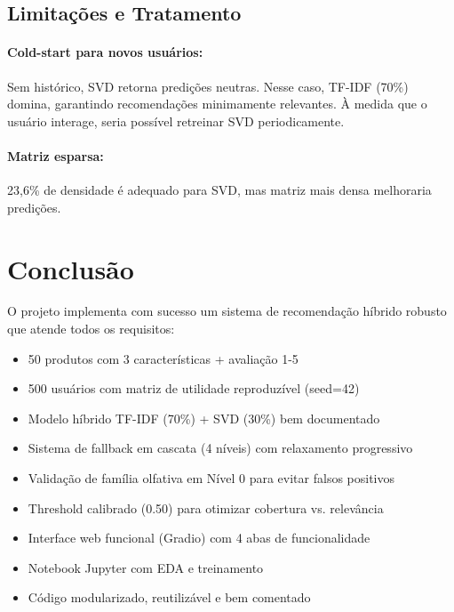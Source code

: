 \documentclass[12pt,a4paper]{article}
\begin{document}
\subsection{Limitações e Tratamento}

\paragraph{Cold-start para novos usuários:}
Sem histórico, SVD retorna predições neutras. Nesse caso, TF-IDF (70\%) domina, garantindo recomendações minimamente relevantes. À medida que o usuário interage, seria possível retreinar SVD periodicamente.

\paragraph{Matriz esparsa:}
23,6\% de densidade é adequado para SVD, mas matriz mais densa melhoraria predições.

\section{Conclusão}

O projeto implementa com sucesso um sistema de recomendação híbrido robusto que atende todos os requisitos:

\begin{itemize}
    \item[$\checkmark$] 50 produtos com 3 características + avaliação 1-5
    \item[$\checkmark$] 500 usuários com matriz de utilidade reproduzível (seed=42)
    \item[$\checkmark$] Modelo híbrido TF-IDF (70\%) + SVD (30\%) bem documentado
    \item[$\checkmark$] Sistema de fallback em cascata (4 níveis) com relaxamento progressivo
    \item[$\checkmark$] Validação de família olfativa em Nível 0 para evitar falsos positivos
    \item[$\checkmark$] Threshold calibrado (0.50) para otimizar cobertura vs. relevância
    \item[$\checkmark$] Interface web funcional (Gradio) com 4 abas de funcionalidade
    \item[$\checkmark$] Notebook Jupyter com EDA e treinamento
    \item[$\checkmark$] Código modularizado, reutilizável e bem comentado
\end{itemize}
\end{document}
